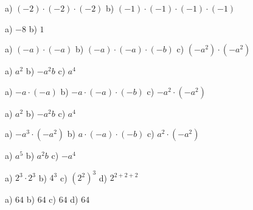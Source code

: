     \begin{tehtava}
        a) $(-2)\cdot(-2)\cdot(-2)$ \qquad
        b) $(-1)\cdot(-1)\cdot(-1)\cdot(-1)$
        
        \begin{vastaus}
            a) $ -8$ \qquad
            b) $1$
        \end{vastaus}
    \end{tehtava}
    
    \begin{tehtava}
        a) $(-a)\cdot(-a)$ \qquad
        b) $(-a)\cdot(-a)\cdot(-b)$ \qquad
        c) $(-a^2)\cdot(-a^2)$

        \begin{vastaus}
            a) $a^2$ \qquad
            b) $-a^2b$ \qquad
            c) $a^4$
        \end{vastaus}
    \end{tehtava}

    \begin{tehtava}
        a) $-a\cdot(-a)$ \qquad
        b) $-a\cdot(-a)\cdot(-b)$ \qquad
        c) $-a^2\cdot(-a^2)$
    
        \begin{vastaus}
            a) $a^2$ \qquad
            b) $-a^2b$ \qquad
            c) $a^4$
        \end{vastaus}
    \end{tehtava}

    \begin{tehtava}
        a) $-a^3\cdot(-a^2)$ \qquad
        b) $a\cdot(-a)\cdot(-b)$ \qquad
        c) $a^2\cdot(-a^2)$
        
        \begin{vastaus}
            a) $a^5$ \qquad
            b) $a^2b$ \qquad
            c) $-a^4$
        \end{vastaus}
    \end{tehtava}

    \begin{tehtava}
        a) $2^3\cdot2^3$ \qquad
        b) $4^3$ \qquad
        c) $(2^2)^3$ \qquad
        d) $2^{2+2+2}$

        \begin{vastaus}
            a) $64$ \qquad
            b) $64$ \qquad
            c) $64$ \qquad
            d) $64$
        \end{vastaus}
    \end{tehtava}

